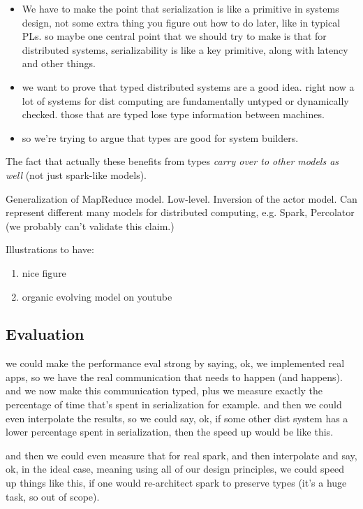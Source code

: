 \documentclass{sigplanconf}
\theoremstyle{definition}
\theoremstyle{definition}
\begin{document}
\begin{itemize}

\item We have to make the point that serialization is like a primitive in
systems design, not some extra thing you figure out how to do later, like in
typical PLs. so maybe one central point that we should try to make is that
for distributed systems, serializability is like a key primitive, along with
latency and other things.

\item we want to prove that typed distributed systems are a good idea. right
now a lot of systems for dist computing are fundamentally untyped or
dynamically checked. those that are typed lose type information between
machines.

\item so we're trying to argue that types are good for system builders.

\end{itemize}

The fact that actually these benefits from types \emph{carry over to other
models as well} (not just spark-like models).


Generalization of MapReduce model. Low-level. Inversion of the actor model.
Can represent different many models for distributed computing, e.g. Spark,
Percolator (we probably can't validate this claim.)

Illustrations to have:
\begin{enumerate}
\item nice figure
\item organic evolving model on youtube
\end{enumerate}

\subsection{Evaluation}

we could make the performance eval strong by saying, ok, we implemented real
apps, so we have the real communication that needs to happen (and happens).
and we now make this communication typed, plus we measure exactly the
percentage of time that's spent in serialization for example. and then we
could even interpolate the results, so we could say, ok, if some other dist
system has a lower percentage spent in serialization, then the speed up would
be like this.

and then we could even measure that for real spark, and then interpolate and
say, ok, in the ideal case, meaning using all of our design principles, we
could speed up things like this, if one would re-architect spark to preserve
types (it's a huge task, so out of scope).
\end{document}
